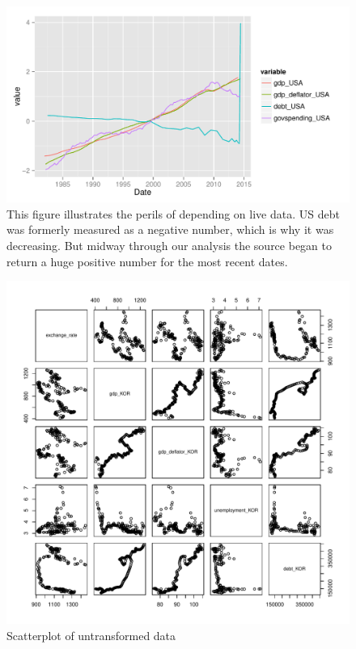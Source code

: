 \documentclass[12pt]{article}
\begin{document}
\begin{figure}
  \centering
    \includegraphics{na_plot_USA.pdf}
  \caption{This figure illustrates the perils of depending on live data. US debt was
formerly measured as a negative number, which is why it was decreasing. But
midway through our analysis the source began to return a huge positive
number for the most recent dates.}

  \label{fig:na_plot_USA}
\end{figure}
\begin{figure}
  \centering
    \includegraphics{scatterplot.pdf}
  \caption{Scatterplot of untransformed data}
  \label{fig:scatterplot}
\end{figure}
\end{document}
